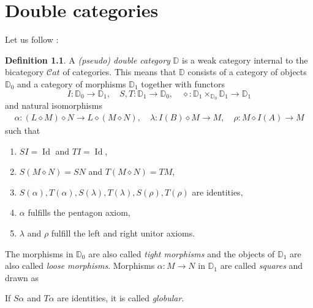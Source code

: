 \documentclass[11pt]{report}
\theoremstyle{definition}
\newtheorem{definition}[theorem]{Definition}
\theoremstyle{remark}
\theoremstyle{remark}
\begin{document}
\chapter{Double categories}\label{appendix:doubleCats}

Let us follow \cite{article:hansen:2019}:

\begin{definition}
A \emph{(pseudo) double category} $\mathbb{D}$ is a weak category internal to the bicategory $\mathcal{C}at$ of categories. This means that $\mathbb{D}$ consists of a category of objects $\mathbb{D}_0$ and a category of morphisms $\mathbb{D}_1$ together with functors
\begin{equation*}
I: \mathbb{D}_0 \to \mathbb{D}_1, \quad S,T: \mathbb{D}_1 \to \mathbb{D}_0, \quad \diamond: \mathbb{D}_1 \times_{\mathbb{D}_0} \mathbb{D}_1 \to \mathbb{D}_1
\end{equation*}
and natural isomorphisms
\begin{align*}
\alpha: (L \diamond M) \diamond N \to L \diamond (M \diamond N), \quad \lambda: I(B) \diamond M \to M, \quad \rho: M \diamond I(A) \to M
\end{align*}
such that
\begin{enumerate}[label=(\roman*)]
\item $SI = \operatorname{Id}$ and $TI = \operatorname{Id}$,
\item $S(M \diamond N) = SN$ and $T(M \diamond N) = TM$,
\item $S(\alpha), T(\alpha), S(\lambda), T(\lambda), S(\rho), T(\rho)$ are identities,
\item $\alpha$ fulfills the pentagon axiom,
\item $\lambda$ and $\rho$ fulfill the left and right unitor axioms.
\end{enumerate}
The morphisms in $\mathbb{D}_0$ are also called \emph{tight morphisms} and the objects of $\mathbb{D}_1$ are also called \emph{loose morphisms}. Morphisms $\alpha: M \to N$ in $\mathbb{D}_1$ are called \emph{squares} and drawn as
\begin{center}
\end{center}
If $S\alpha$ and $T\alpha$ are identities, it is called \emph{globular}.
\end{definition}
\end{document}
